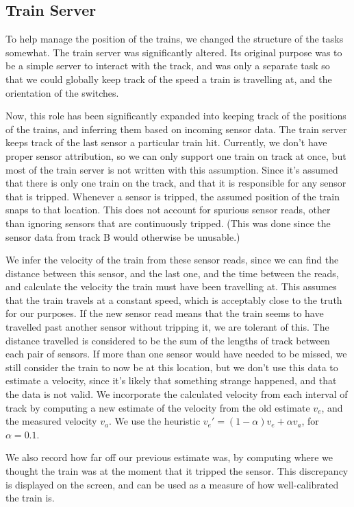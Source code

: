 \documentclass[titlepage]{article}
\begin{document}
\subsection{Train Server}
To help manage the position of the trains, we changed the structure of the
tasks somewhat.
The train server was significantly altered.
Its original purpose was to be a simple server to interact with the track,
and was only a separate task so that we could globally keep track of the
speed a train is travelling at, and the orientation of the switches.

Now, this role has been significantly expanded into keeping track of the
positions of the trains, and inferring them based on incoming sensor data.
The train server keeps track of the last sensor a particular train hit.
Currently, we don't have proper sensor attribution, so we can only support
one train on track at once, but most of the train server is not written with
this assumption.
Since it's assumed that there is only one train on the track, and that
it is responsible for any sensor that is tripped.
Whenever a sensor is tripped, the assumed position of the train snaps to that
location.
This does not account for spurious sensor reads, other than ignoring
sensors that are continuously tripped.
(This was done since the sensor data from track B would otherwise be unusable.)

We infer the velocity of the train from these sensor reads, since we can
find the distance between this sensor, and the last one, and the time between
the reads, and calculate the velocity the train must have been travelling at.
This assumes that the train travels at a constant speed, which is acceptably
close to the truth for our purposes.
If the new sensor read means that the train seems to have travelled past
another sensor without tripping it, we are tolerant of this.
The distance travelled is considered to be the sum of the lengths of track
between each pair of sensors.
If more than one sensor would have needed to be missed, we still consider the
train to now be at this location, but we don't use this data to estimate
a velocity, since it's likely that something strange happened, and that
the data is not valid.
We incorporate the calculated velocity from each interval of track by computing
a new estimate of the velocity from the old estimate $v_e$, and the measured
velocity $v_a$.
We use the heuristic $v_e' = (1 - \alpha) v_e + \alpha v_a$, for $\alpha = 0.1$.

We also record how far off our previous estimate was, by computing where
we thought the train was at the moment that it tripped the sensor.
This discrepancy is displayed on the screen, and can be used as a measure of
how well-calibrated the train is.
\end{document}
